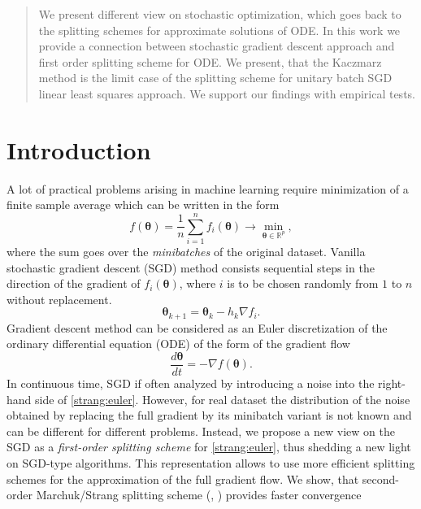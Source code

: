 \documentclass{article}
\newcommand{\vect}[1]{\boldsymbol{\mathbf{#1}}}
\begin{document}
\begin{abstract}
We present different view on stochastic optimization, which goes back to the splitting schemes for approximate solutions of ODE. In this work we provide a connection between stochastic gradient descent approach and first order splitting scheme for ODE. We present, that the Kaczmarz method is the limit case of the splitting scheme for unitary batch SGD linear least squares approach. We support our findings with empirical tests.
\end{abstract}

\section{Introduction}
A lot of practical problems arising in machine learning require minimization of a finite sample average which can be written in the form
\begin{equation}\label{strang:finitesum}
    f(\vect{\vect{\theta}}) = \frac{1}{n} \sum_{i=1}^n f_i(\vect{\vect{\theta}}) \rightarrow \min_{\vect{\vect{\theta}} \in \mathbb{R}^p},
\end{equation}
where the sum goes over the \emph{minibatches} of the original dataset. Vanilla stochastic gradient descent (SGD) method \cite{robbins1951stochastic} consists sequential steps in the direction of the gradient of $f_i(\vect{\theta})$, where $i$ is to be chosen randomly from $1$ to $n$ without replacement.
\begin{equation}
\vect{\theta}_{k+1} = \vect{\theta}_{k} - h_{k} \nabla f_i.
\end{equation}
Gradient descent method can be considered as an Euler discretization of the ordinary differential equation (ODE) of the form of the gradient flow
\begin{equation}\label{strang:euler}
    \frac{d \vect{\theta}}{d t} = -\nabla f(\vect{\theta}).
\end{equation}
In continuous time, SGD if often analyzed by introducing a noise into the right-hand side of \eqref{strang:euler}. However, for real dataset the distribution of the noise obtained by replacing the full gradient by its minibatch variant is not known and can be different for different problems. Instead, we propose a new view on the SGD as a \emph{first-order splitting scheme} for \eqref{strang:euler}, thus shedding a new light on SGD-type algorithms. This representation allows to use more efficient splitting schemes for the approximation of the full gradient flow. We show, that second-order Marchuk/Strang splitting scheme (\cite{marchuk1968some}, \cite{strang1968construction}) provides faster convergence 
\end{document}
